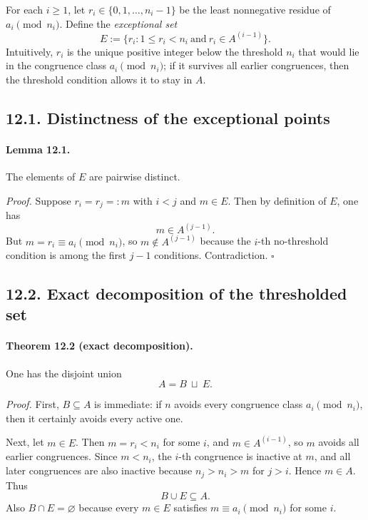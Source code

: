 For each $i\ge 1$, let $r_i\in\{0,1,\dots,n_i-1\}$ be the least nonnegative residue of $a_i\pmod{n_i}$.  Define the \emph{exceptional set}
\begin{equation}
E := \{r_i: 1\le r_i < n_i\ \text{and}\ r_i\in A^{(i-1)}\}.
\tag{12.4}
\end{equation}
Intuitively, $r_i$ is the unique positive integer below the threshold $n_i$ that would lie in the congruence class $a_i\pmod{n_i}$; if it survives all earlier congruences, then the threshold condition allows it to stay in $A$.

\subsection*{12.1. Distinctness of the exceptional points}
\paragraph{Lemma 12.1.}
The elements of $E$ are pairwise distinct.

\emph{Proof.}
Suppose $r_i=r_j=:m$ with $i<j$ and $m\in E$.  Then by definition of $E$, one has
\[
m\in A^{(j-1)}.
\]
But $m=r_i\equiv a_i\pmod{n_i}$, so $m\notin A^{(j-1)}$ because the $i$-th no-threshold condition is among the first $j-1$ conditions.  Contradiction.  \hfill $\square$

\subsection*{12.2. Exact decomposition of the thresholded set}
\paragraph{Theorem 12.2 (exact decomposition).}
One has the disjoint union
\begin{equation}
A = B\ \sqcup\ E.
\tag{12.5}
\end{equation}

\emph{Proof.}
First, $B\subseteq A$ is immediate: if $n$ avoids every congruence class $a_i\pmod{n_i}$, then it certainly avoids every active one.

Next, let $m\in E$.  Then $m=r_i<n_i$ for some $i$, and $m\in A^{(i-1)}$, so $m$ avoids all earlier congruences.  Since $m<n_i$, the $i$-th congruence is inactive at $m$, and all later congruences are also inactive because $n_j>n_i>m$ for $j>i$.  Hence $m\in A$.  Thus
\[
B\cup E\subseteq A.
\]
Also $B\cap E=\varnothing$ because every $m\in E$ satisfies $m\equiv a_i\pmod{n_i}$ for some $i$.

